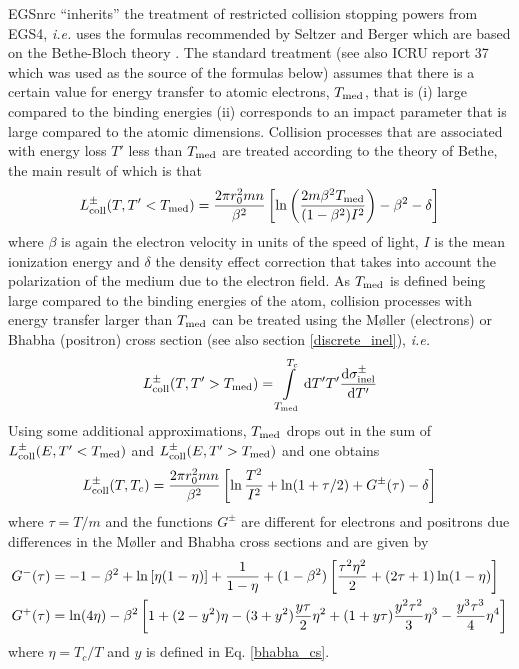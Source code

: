 EGSnrc ``inherits'' the treatment of restricted collision 
stopping powers from EGS4, {\em i.e.} uses the formulas 
recommended by Seltzer and Berger \cite{BS64} which are based 
on the Bethe-Bloch theory \cite{Be30,Be32,Bl33}. The standard 
treatment (see also ICRU report 37 \cite{ICRU37} which was 
used as the source of the formulas below) 
assumes that there is a certain value for energy 
transfer to atomic electrons, $T_{\rm med}$, that is (i) 
large compared to the binding energies (ii) corresponds to 
an impact parameter that is large compared to the atomic 
dimensions. Collision processes that are associated with 
energy loss $T'$ less than $T_{\rm med}$ are treated according to 
the theory of Bethe, the main result of which is that
\begin{equation}
L_{\rm coll}^\pm(T,T' < T_{\rm med}) = {2 \pi r_0^2 m n \over \beta^2} 
\left[ \ln \left(2 m \beta^2 T_{\rm med} \over (1 - \beta^2) I^2 \right) 
- \beta^2 - \delta \right]
\end{equation}
where $\beta$ is again the electron velocity in units of 
the speed of light, $I$ is the mean ionization energy and 
$\delta$ the density effect correction that takes into 
account the polarization of the medium due to the electron field. 
As $T_{\rm med}$ is defined being large compared to the binding energies of 
the atom, collision processes with energy transfer larger 
than $T_{\rm med}$ can be treated using the M{\o}ller \cite{Mo32a} (electrons) 
or Bhabha \cite{Bh35} (positron) cross section (see also section 
\ref{discrete_inel}), {\em i.e.}
 
\begin{equation}
L_{\rm coll}^\pm(T,T' > T_{\rm med}) = \int\limits_{T_{\rm med}}^{T_c} 
{\rm d}T' T' {{\rm d} \sigma_{\rm inel}^\pm \over {\rm d}T'}
\end{equation}
Using some additional approximations, $T_{\rm med}$ drops out 
in the sum of $L_{\rm coll}^\pm(E,T' < T_{\rm med})$ and 
$L_{\rm coll}^\pm(E,T' > T_{\rm med})$ and one obtains
\begin{equation}
L_{\rm coll}^\pm(T,T_c) = {2 \pi r_0^2 m n \over \beta^2} 
\left[ \ln {T^2 \over I^2} + \ln(1 + \tau/2) + G^\pm(\tau) - \delta \right]
\end{equation}
where $\tau = T/m$ and the functions $G^\pm$ are different for 
electrons and positrons due differences in the M{\o}ller and 
Bhabha cross sections and are given by
\begin{equation}
\begin{split}
G^-(\tau) & = -1 - \beta^2  + \ln\left[ \eta (1 - \eta) \right] + 
{1 \over 1 - \eta} + (1 - \beta^2) \left[ {\tau^2 \eta^2 \over 2} + 
(2 \tau + 1) \ln(1 - \eta) \right] \\
G^+(\tau) & = \ln(4 \eta) - \beta^2 \left[ 1 + (2 - y^2) \eta - 
(3 + y^2) {y \tau \over 2} \eta^2 + (1 + y \tau) {y^2 \tau^2 \over 3} \eta^3 
- {y^3 \tau^3 \over 4} \eta^4 
\right]
\end{split}
\end{equation}
where $\eta = T_c/T$ and $y$ is defined in Eq. \eqref{bhabha_cs}. 

